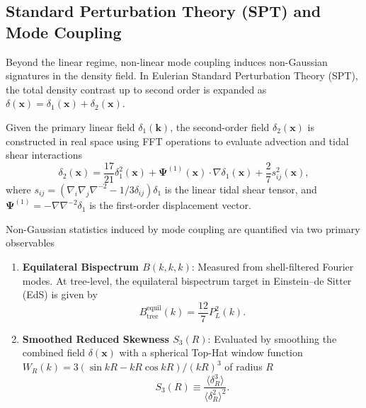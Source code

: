 \subsection{Standard Perturbation Theory (SPT) and Mode Coupling}
\label{subsec:spt_methodology}

Beyond the linear regime, non-linear mode coupling induces non-Gaussian signatures in the density field. 
In Eulerian Standard Perturbation Theory (SPT), the total density contrast up to second order is expanded as $\delta(\mathbf{x}) = \delta_1(\mathbf{x}) + \delta_2(\mathbf{x})$.

Given the primary linear field $\delta_1(\mathbf{k})$, the second-order field $\delta_2(\mathbf{x})$ is constructed in real space using FFT operations to evaluate advection and tidal shear interactions
    \begin{equation}
        \delta_2(\mathbf{x}) = \frac{17}{21} \delta_1^2(\mathbf{x}) + \mathbf{\Psi}^{(1)}(\mathbf{x}) \cdot \nabla \delta_1(\mathbf{x}) + \frac{2}{7} s_{ij}^2(\mathbf{x}),
        \label{eq:spt_delta2_real_space}
    \end{equation}
where $s_{ij} = \left(\nabla_i \nabla_j \nabla^{-2} - 1/3\delta_{ij}\right) \delta_1$ is the linear tidal shear tensor, and $\mathbf{\Psi}^{(1)} = -\nabla \nabla^{-2} \delta_1$ is the first-order displacement vector.

Non-Gaussian statistics induced by mode coupling are quantified via two primary observables
    \begin{enumerate}
    
    \item \textbf{Equilateral Bispectrum $B(k, k, k)$}: Measured from shell-filtered Fourier modes. At tree-level, the equilateral bispectrum target in Einstein--de Sitter (EdS) is given by
        \begin{equation}
            B_{\mathrm{tree}}^{\mathrm{equil}}(k) = \frac{12}{7} P_L^2(k).
            \label{eq:tree_level_bispectrum}
        \end{equation}
        
    \item \textbf{Smoothed Reduced Skewness $S_3(R)$}: Evaluated by smoothing the combined field $\delta(\mathbf{x})$ with a spherical Top-Hat window function $W_R(k) = 3(\sin kR - kR \cos kR)/(kR)^3$ of radius $R$
    \begin{equation}
        S_3(R) \equiv \frac{\langle \delta_R^3 \rangle}{\langle \delta_R^2 \rangle^2}.
        \label{eq:reduced_skewness}
    \end{equation}
\end{enumerate}
